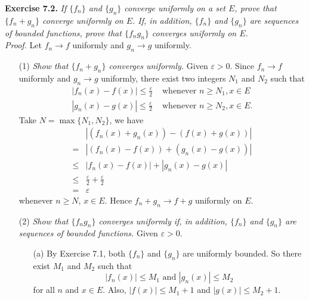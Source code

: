 \documentclass{article}
\begin{document}
\textbf{Exercise 7.2.}
\emph{If $\{f_n\}$ and $\{g_n\}$ converge uniformly on a set $E$,
prove that $\{f_n + g_n\}$ converge uniformly on $E$.
If, in addition, $\{f_n\}$ and $\{g_n\}$ are sequences of bounded functions,
prove that $\{f_n g_n\}$ converges uniformly on $E$.} \\

\emph{Proof.}
Let $f_n \to f$ uniformly and $g_n \to g$ uniformly.
\begin{enumerate}
  \item[(1)]
  \emph{Show that $\{f_n + g_n\}$ converges uniformly.}
    Given $\varepsilon > 0$.
    Since $f_n \to f$ uniformly and $g_n \to g$ uniformly,
    there exist two integers $N_1$ and $N_2$ such that
    \begin{align*}
      |f_n(x) - f(x)| \leq \frac{\varepsilon}{2}
      &\text{ whenever }
      n \geq N_1, x \in E \\
      |g_n(x) - g(x)| \leq \frac{\varepsilon}{2}
      &\text{ whenever }
      n \geq N_2, x \in E.
    \end{align*}
    Take $N = \max\{N_1,N_2\}$, we have
    \begin{align*}
      &|(f_n(x)+ g_n(x)) - (f(x) + g(x))| \\
      =& |(f_n(x) - f(x)) + (g_n(x) - g(x))| \\
      \leq& |f_n(x) - f(x)| + |g_n(x) - g(x)| \\
      \leq& \frac{\varepsilon}{2} + \frac{\varepsilon}{2} \\
      =& \varepsilon
    \end{align*}
    whenever $n \geq N$, $x \in E$.
    Hence $f_n + g_n \to f+g$ uniformly on $E$.

  \item[(2)]
  \emph{Show that $\{f_n g_n\}$ converges uniformly
  if, in addition, $\{f_n\}$ and $\{g_n\}$ are sequences of bounded functions.}
  Given $\varepsilon > 0$.
  \begin{enumerate}
    \item[(a)]
    By Exercise 7.1, both $\{f_n\}$ and $\{g_n\}$ are uniformly bounded.
    So there exist $M_1$ and $M_2$
    such that
    \[
      |f_n(x)| \leq M_1 \text{ and } |g_n(x)| \leq M_2
    \]
    for all $n$ and $x \in E$.
    Also, $|f(x)| \leq M_1 + 1$ and $|g(x)| \leq M_2 + 1$.


\end{enumerate}
\end{enumerate}
\end{document}
